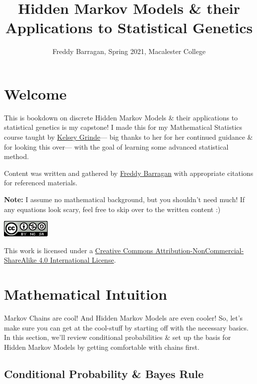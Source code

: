 \documentclass[
]{book}
\title{Hidden Markov Models \& their Applications to Statistical Genetics}
\author{Freddy Barragan, Spring 2021, Macalester College}
\date{}
\begin{document}
\maketitle

{
\setcounter{tocdepth}{1}
\tableofcontents
}
\hypertarget{welcome}{%
\chapter*{Welcome}\label{welcome}}

This is bookdown on discrete Hidden Markov Models \& their applications to statistical genetics is my capstone! I made this for my Mathematical Statistics course taught by \href{\%22http://kegrinde.github.io\%22}{Kelsey Grinde}--- big thanks to her for her continued guidance \& for looking this over--- with the goal of learning some advanced statistical method.

Content was written and gathered by \href{\%22https://freddybarragan.netlify.app\%22}{Freddy Barragan} with appropriate citations for referenced materials.

\textbf{Note:}
I assume no mathematical background, but you shouldn't need much! If any equations look scary, feel free to skip over to the written content :)

\includegraphics{images/cc_license_button.png}

This work is licensed under a \href{https://creativecommons.org/licenses/by-nc-sa/4.0/}{Creative Commons Attribution-NonCommercial-ShareAlike 4.0 International License}.

\hypertarget{mathematical-intuition}{%
\chapter{Mathematical Intuition}\label{mathematical-intuition}}

Markov Chains are cool! And Hidden Markov Models are even cooler! So, let's make sure you can get at the cool-stuff by starting off with the necessary basics. In this section, we'll review conditional probabilities \& set up the basis for Hidden Markov Models by getting comfortable with chains first.

\hypertarget{conditional-probability-bayes-rule}{%
\section{Conditional Probability \& Bayes Rule}\label{conditional-probability-bayes-rule}}
\end{document}
